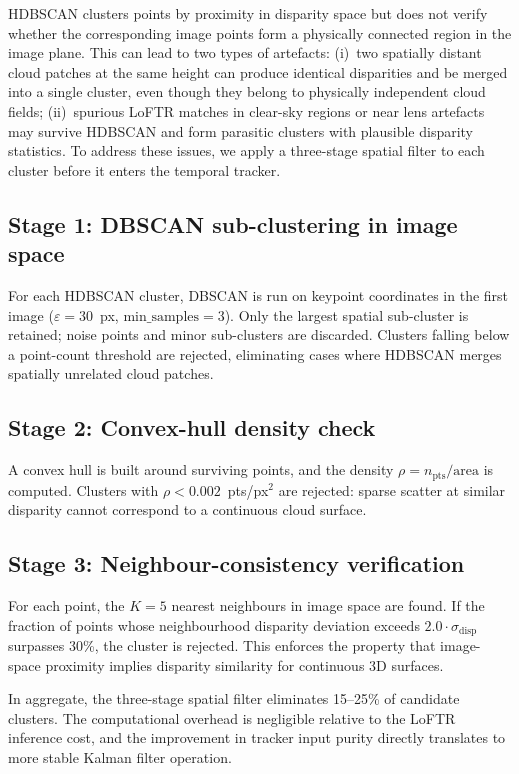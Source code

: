 \documentclass[preprint,
superscriptaddress,
amsmath,amssymb,aps,
twoside,final,secnumarabic,
nofootinbib]{revtex4-2}
\begin{document}
HDBSCAN clusters points by proximity in disparity space but does not verify whether the corresponding image points form a physically connected region in the image plane. This can lead to two types of artefacts: (i)~two spatially distant cloud patches at the same height can produce identical disparities and be merged into a single cluster, even though they belong to physically independent cloud fields; (ii)~spurious LoFTR matches in clear-sky regions or near lens artefacts may survive HDBSCAN and form parasitic clusters with plausible disparity statistics. To address these issues, we apply a three-stage spatial filter to each cluster before it enters the temporal tracker.

\subsection{Stage 1: DBSCAN sub-clustering in image space}

For each HDBSCAN cluster, DBSCAN is run on keypoint coordinates in the first image ($\varepsilon = 30$~px, $\text{min\_samples} = 3$). Only the largest spatial sub-cluster is retained; noise points and minor sub-clusters are discarded. Clusters falling below a point-count threshold are rejected, eliminating cases where HDBSCAN merges spatially unrelated cloud patches.

\subsection{Stage 2: Convex-hull density check}

A convex hull is built around surviving points, and the density $\rho = n_\text{pts} / \text{area}$ is computed. Clusters with $\rho < 0.002$~pts/px$^2$ are rejected: sparse scatter at similar disparity cannot correspond to a continuous cloud surface.

\subsection{Stage 3: Neighbour-consistency verification}

For each point, the $K = 5$ nearest neighbours in image space are found. If the fraction of points whose neighbourhood disparity deviation exceeds $2.0 \cdot \sigma_\text{disp}$ surpasses 30\%, the cluster is rejected. This enforces the property that image-space proximity implies disparity similarity for continuous 3D surfaces.

In aggregate, the three-stage spatial filter eliminates 15--25\% of candidate clusters. The computational overhead is negligible relative to the LoFTR inference cost, and the improvement in tracker input purity directly translates to more stable Kalman filter operation.
\end{document}
